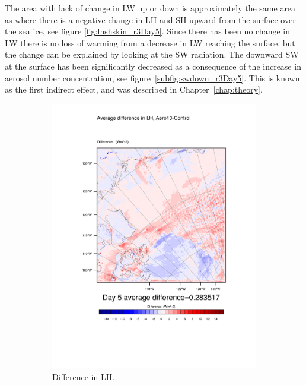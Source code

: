 The area with lack of change in LW up or down is approximately the same area as where there is a negative change in LH and SH upward from the surface over the sea ice, see figure \ref{fig:lhshskin_r3Day5}. Since there has been no change in LW there is no loss of warming from a decrease in LW reaching the surface, but the change can be explained by looking at the SW radiation. The downward SW at the surface has been significantly decreased as a consequence of the increase in aerosol number concentration, see figure~\ref{subfig:swdown_r3Day5}. This is known as the first indirect effect, and was described in Chapter~\ref{chap:theory}. 
\begin{figure}
\centering
	\begin{subfigure}{0.48\textwidth}
		\includegraphics[width=\textwidth]{results/aero10/diff_Aero10_LH_Day5.pdf}
		\caption{Difference in LH.}
		\label{subfig:lh_r3Day5}
	\end{subfigure}
	\quad
	\begin{subfigure}{0.48\textwidth}

\end{subfigure}
\end{figure}
